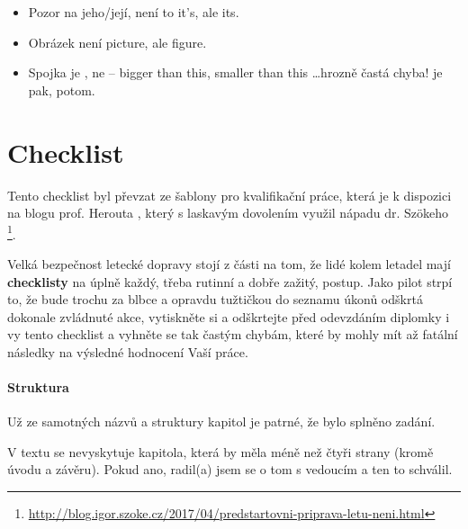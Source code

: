 \begin{itemize}
  \item{Pozor na jeho/její, není to it's, ale its.}
  \item{Obrázek není picture, ale figure. }
  \item{Spojka  je , ne  -- bigger than this, smaller than this \ldots hrozně častá chyba!  je pak, potom.}
\end{itemize}


\chapter{Checklist} 
\label{checklist}
Tento checklist byl převzat ze šablony pro kvalifikační práce, která je k dispozici na blogu prof. Herouta \cite{Herout}, který s laskavým dovolením využil nápadu dr. Szökeho%
\footnote{\url{http://blog.igor.szoke.cz/2017/04/predstartovni-priprava-letu-neni.html}}. 

Velká bezpečnost letecké dopravy stojí z části na tom, že lidé kolem letadel mají \textbf{checklisty} na úplně každý, třeba rutinní a dobře zažitý, postup. Jako pilot strpí to, že bude trochu za blbce a opravdu tužtičkou do seznamu úkonů odškrtá dokonale zvládnuté akce, vytiskněte si a odškrtejte před odevzdáním diplomky i vy tento checklist a vyhněte se tak častým chybám, které by mohly mít až fatální následky na výsledné hodnocení Vaší práce.

\subsubsection*{Struktura}
\begin{checklist}
	\item Už ze samotných názvů a struktury kapitol je patrné, že bylo splněno zadání.
	\item V textu se nevyskytuje kapitola, která by měla méně než čtyři strany (kromě úvodu a závěru). Pokud ano, radil(a) jsem se o tom s vedoucím a ten to schválil.
\end{checklist}

